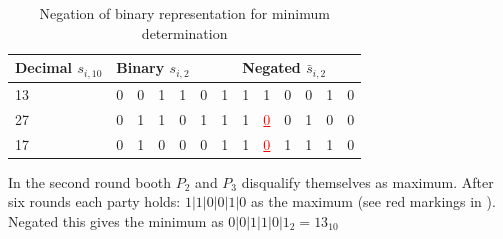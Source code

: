 \begin{table}[!htb]
	\centering
	\caption{Negation of binary representation for minimum determination} \label{table:secure minimum negation}
	\begin{tabular}{|l|l|l|l|l|l|l|l|l|l|l|l|l|}
		\hline
		Decimal $s_{i,10}$ & \multicolumn{6}{l|}{Binary $s_{i,2}$}  & \multicolumn{6}{l|}{Negated $\bar{s}_{i,2}$} \\ \hline
		13                 & 0    & 0    & 1    & 1    & 0   & 1 & 1    & 1    & 0    & 0    & 1   & 0   \\ \hline
		27                 & 0    & 1    & 1    & 0    & 1   & 1 & 1    & \textcolor{red}{\underline{0}} & 0    & 1    & 0   & 0   \\ \hline
		17                 & 0    & 1    & 0    & 0    & 0   & 1 & 1    & \textcolor{red}{\underline{0}} & 1    & 1    & 1   & 0   \\ \hline
	\end{tabular}
\end{table}

In the second round booth $P_2$ and $P_3$ disqualify themselves as maximum. After six rounds each party holds: $1|1|0|0|1|0$ as the maximum (see red markings in ). Negated this gives the minimum as $0|0|1|1|0|1_2=13_{10}$ 

\FloatBarrier

